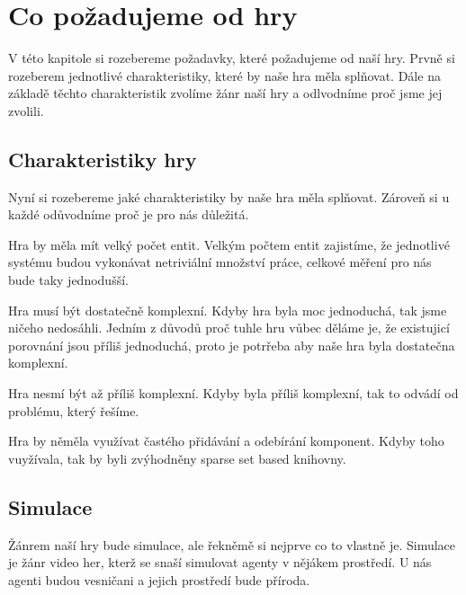 \chapter{Co požadujeme od hry}
V této kapitole si rozebereme požadavky, které požadujeme od naší hry. Prvně si rozeberem jednotlivé charakteristiky, které by naše hra měla splňovat. Dále na základě těchto charakteristik zvolíme žánr naší hry a odlvodníme proč jsme jej zvolili.


\section{Charakteristiky hry}
Nyní si rozebereme jaké charakteristiky by naše hra měla splňovat. Zároveň si u každé odůvodníme proč je pro nás důležitá.

Hra by měla mít velký počet entit. Velkým počtem entit zajistíme, že jednotlivé systému budou vykonávat netriviální množství práce, celkové měření pro nás bude taky jednodušší.

Hra musí být dostatečně komplexní. Kdyby hra byla moc jednoduchá, tak jsme ničeho nedosáhli. Jedním z důvodů proč tuhle hru vůbec děláme je, že existujicí porovnání jsou příliš jednoduchá, proto je potrřeba aby naše hra byla dostatečna komplexní.

Hra nesmí být až příliš komplexní. Kdyby byla příliš komplexní, tak to odvádí od problému, který řešíme.

Hra by něměla využívat častého přidávání a odebírání komponent. Kdyby toho vuyžívala, tak by byli zvýhodněny sparse set based knihovny.


\section{Simulace}
Žánrem naší hry bude simulace, ale řekněmě si nejprve co to vlastně je. Simulace je žánr video her, kterž se snaší simulovat agenty v nějákem prostředí. U nás agenti budou vesničani a jejich prostředí bude příroda.

